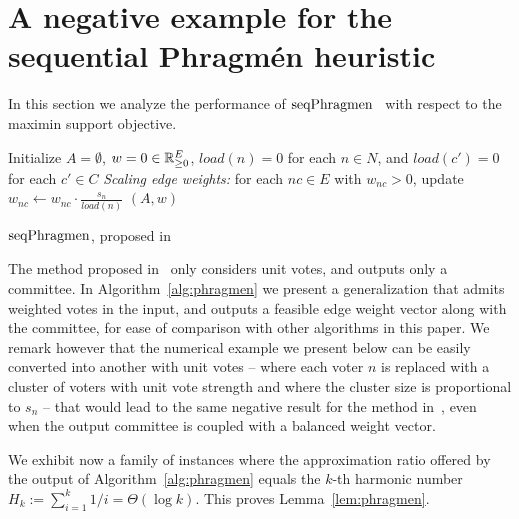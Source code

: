 \section{A negative example for the sequential Phragm\'{e}n heuristic}\label{s:phragmen}

In this section we analyze the performance of $\operatorname{seqPhragmen}$~\cite{brill2017phragmen} with respect to the maximin support objective. 

\begin{algorithm}[htb]\label{alg:phragmen}
\SetAlgoLined
{}
Initialize $A=\emptyset$, $w=0\in \mathbb{R}_{\geq 0}^E$, $load(n)=0$ for each $n\in N$, and $load(c')=0$ for each $c'\in C$\;
\emph{Scaling edge weights:} for each $nc\in E$ with $w_{nc}>0$, update $w_{nc}\leftarrow w_{nc}\cdot \frac{s_n}{load(n)}$\; 
\Return $(A,w)$\;
\caption{$\operatorname{seqPhragmen}$, proposed in~\cite{brill2017phragmen}}
\end{algorithm}

The method proposed in~\cite{brill2017phragmen} only considers unit votes, and outputs only a committee. 
In Algorithm~\ref{alg:phragmen} we present a generalization that admits weighted votes in the input, and outputs a feasible edge weight vector along with the committee, for ease of comparison with other algorithms in this paper. 
We remark however that the numerical example we present below can be easily converted into another with unit votes -- where each voter $n$ is replaced with a cluster of voters with unit vote strength and where the cluster size is proportional to $s_n$ -- that would lead to the same negative result for the method in~\cite{brill2017phragmen}, even when the output committee is coupled with a balanced weight vector.

We exhibit now a family of instances where the approximation ratio offered by the output of Algorithm~\ref{alg:phragmen} equals the $k$-th harmonic number $H_k:=\sum_{i=1}^k 1/i = \Theta(\log k)$. This proves Lemma~\ref{lem:phragmen}.

